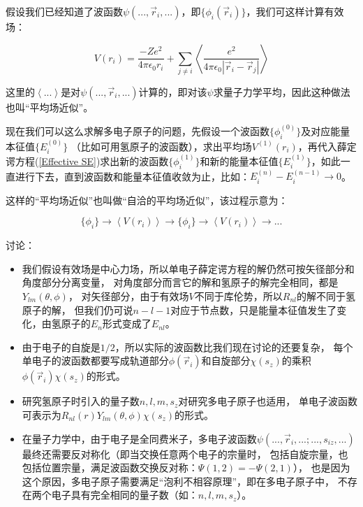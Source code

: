 假设我们已经知道了波函数$\psi(...,\vec r_i,...)$，即$\{ \phi_i(\vec
r_i) \}$，我们可这样计算有效场：


\begin{equation}\label{Effective Field}
    V(r_i)=\frac{-Ze^2}{4\pi \epsilon_0 r_i} + \sum \limits_{j \ne i}
    \left\langle \frac{e^2}{4\pi \epsilon_0 \left| \vec r_i - \vec r_j \right|}  \right\rangle
\end{equation}


这里的$\left\langle ... \right\rangle$是对$\psi(...,\vec
r_i,...)$计算的，即对该$\psi$求量子力学平均，因此这种做法也叫“平均场近似”。


现在我们可以这么求解多电子原子的问题，先假设一个波函数$\{\phi_i^{(0)}\}$及对应能量本征值$\{E^{(0)}_i\}$
（比如可用氢原子的波函数），求出平均场$V^{(1)}(r_i)$，再代入薛定谔方程(\ref{Effective
SE})求出新的波函数$\{\phi_i^{(1)}\}$和新的能量本征值$\{
E^{(1)}_i\}$，如此一直进行下去，直到波函数和能量本征值收敛为止，比如：$E^{(n)}_i
- E^{(n-1)}_i \to 0$。

这样的“平均场近似”也叫做“自洽的平均场近似”，该过程示意为：



\begin{equation*}
    \{\phi_i\} \to \left\langle V(r_i) \right\rangle
    \to \{\phi_i\} \to \left\langle V(r_i) \right\rangle \to
    ...
\end{equation*}


讨论：

\begin{itemize}
  \item 我们假设有效场是中心力场，所以单电子薛定谔方程的解仍然可按矢径部分和角度部分分离变量，
对角度部分而言它的解和氢原子的解完全相同，都是$Y_{lm}(\theta,\phi)$，
对矢径部分，由于有效场$V$不同于库伦势，所以$R_{nl}$的解不同于氢原子的解，
但我们仍可说$n-l-1$对应于节点数，只是能量本征值发生了变化，由氢原子的$E_n$形式变成了$E_{nl}$。

  \item
  由于电子的自旋是$1/2$，所以实际的波函数比我们现在讨论的还要复杂，
  每个单电子的波函数都要写成轨道部分$\phi(\vec r_i)$和自旋部分$\chi(s_z)$的乘积$\phi(\vec r_i)\chi(s_z)$的形式。

  \item
  研究氢原子时引入的量子数$n,l,m,s_z$对研究多电子原子也适用，
  单电子波函数可表示为$R_{nl}(r)Y_{lm}(\theta,\phi)\chi(s_z)$的形式。


  \item 在量子力学中，由于电子是全同费米子，多电子波函数$\psi(...,\vec
  r_i,...;...,s_{iz},...)$最终还需要反对称化（即当交换任意两个电子的宗量时，
  包括自旋宗量，也包括位置宗量，满足波函数交换反对称：$\Psi(1,2)=-\Psi(2,1)$），
  也是因为这个原因，多电子原子需要满足“泡利不相容原理”，即在多电子原子中，
  不存在两个电子具有完全相同的量子数（如：$n,l,m,s_z$）。

\end{itemize}


